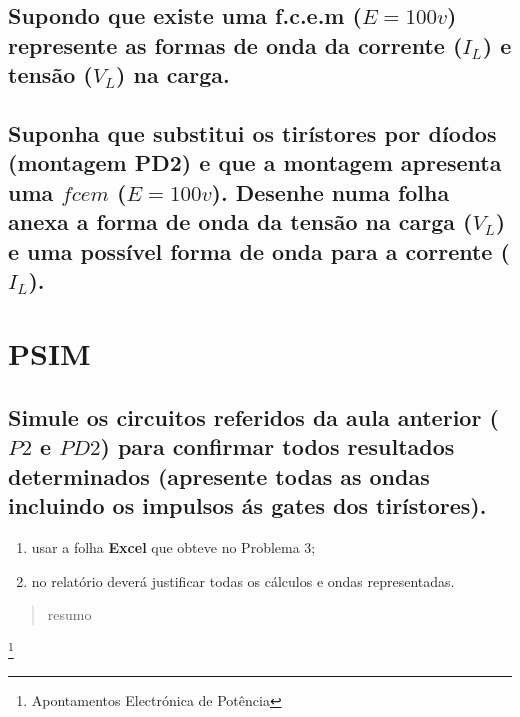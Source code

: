 \documentclass[titlepage, a4paper, 11pt, reqno, openany]{article}%
\begin{document}
\subsection{\textnormal{Supondo que existe uma f.c.e.m ($E=100v$) represente as formas de onda da corrente ($I_L$) e tens\~{a}o ($V_L$) na carga.}}
\subsection{\textnormal{Suponha que substitui os tir\'{i}stores por d\'{i}odos (montagem PD2) e que a montagem apresenta uma $fcem$ ($E=100v$). Desenhe numa folha anexa a forma de onda da tens\~{a}o na carga ($V_L$) e 
uma poss\'{i}vel forma de onda para a corrente ($I_L$).}}





\section{\textnormal{{\bf PSIM}}}\label{A2}
\subsection{\textnormal{Simule os circuitos referidos da aula anterior ($P2$ e $PD2$) para confirmar todos resultados determinados (apresente todas as ondas incluindo os impulsos \'{a}s gates dos tir\'{i}stores).}}


\begin{enumerate}
\item usar a folha {\bf Excel} que obteve no Problema 3;\par 
\item no relat\'{o}rio dever\'{a} justificar todas os c\'{a}lculos e ondas representadas.
\end{enumerate}
\begin{abstract}
%
resumo
%
\end{abstract}

\newpage
\listoffigures
\newpage
\cite{*}

\newpage
\footnote{Apontamentos Electr\'{o}nica de Pot\^{e}ncia}
%
\end{document}
